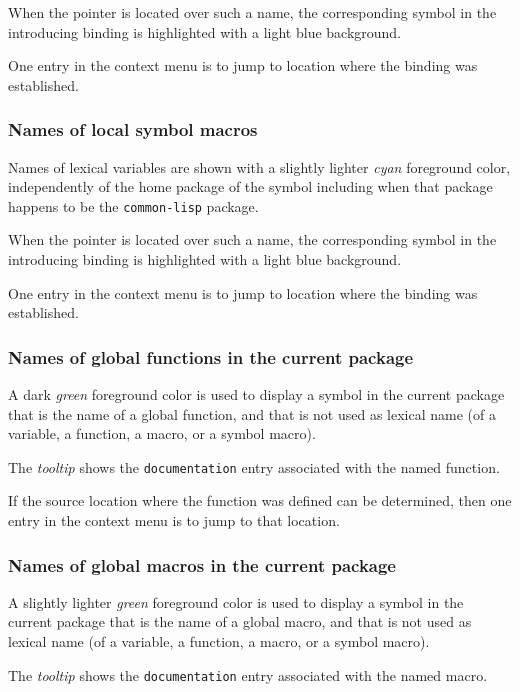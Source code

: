 When the pointer is located over such a name, the corresponding symbol
in the introducing binding is highlighted with a light blue
background. 

One entry in the context menu is to jump to location where the binding
was established. 

\subsubsection{Names of local symbol macros}

Names of lexical variables are shown with a slightly lighter
\emph{cyan} foreground color, independently of the home package of the
symbol including when that package happens to be the
\texttt{common-lisp} package.

When the pointer is located over such a name, the corresponding symbol
in the introducing binding is highlighted with a light blue
background. 

One entry in the context menu is to jump to location where the binding
was established. 

\subsubsection{Names of global functions in the current package}

A dark \emph{green} foreground color is used to display a symbol in the
current package that is the name of a global function, and that is not
used as lexical name (of a variable, a function, a macro, or a symbol
macro).  

The \emph{tooltip} shows the \texttt{documentation} entry associated
with the named function.

If the source location where the function was defined can be
determined, then one entry in the context menu is to jump to that
location.

\subsubsection{Names of global macros in the current package}

A slightly lighter \emph{green} foreground color is used to display a
symbol in the current package that is the name of a global macro, and
that is not used as lexical name (of a variable, a function, a macro,
or a symbol macro).

The \emph{tooltip} shows the \texttt{documentation} entry associated
with the named macro.

